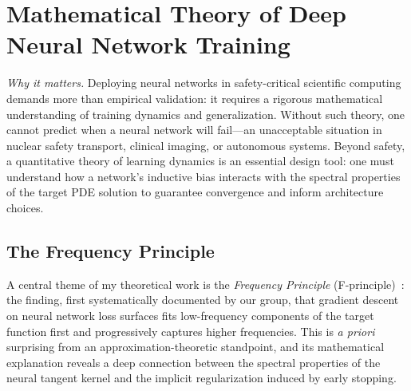 \section{Mathematical Theory of Deep Neural Network Training}

\noindent\textit{Why it matters.}\enspace
Deploying neural networks in safety-critical scientific computing demands
more than empirical validation: it requires a rigorous mathematical
understanding of training dynamics and generalization.  Without such theory,
one cannot predict when a neural network will fail---an unacceptable
situation in nuclear safety transport, clinical imaging, or autonomous
systems.  Beyond safety, a quantitative theory of learning dynamics is an
essential design tool: one must understand how a network's inductive bias
interacts with the spectral properties of the target PDE solution to
guarantee convergence and inform architecture choices.

\subsection{The Frequency Principle}

A central theme of my theoretical work is the \emph{Frequency Principle}
(F-principle)~\cite{FP1}: the finding, first systematically documented by
our group, that gradient descent on neural network loss surfaces fits
low-frequency components of the target function first and progressively
captures higher frequencies.  This is \emph{a priori} surprising from an
approximation-theoretic standpoint, and its mathematical explanation reveals
a deep connection between the spectral properties of the neural tangent
kernel and the implicit regularization induced by early stopping.


